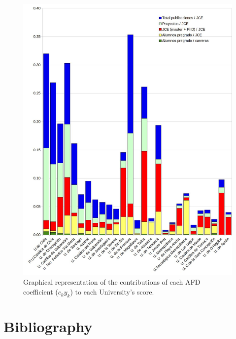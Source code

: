 \documentclass[twocolumn]{article}
\begin{document}
\begin{figure}
\includegraphics[width=\linewidth]{pdf/afd-coefficients-2018.jpg}
\caption{Graphical representation of the contributions of each AFD coefficient ($c_k y_k$) to each University's score.}
\end{figure}

\section*{Bibliography}


\end{document}
